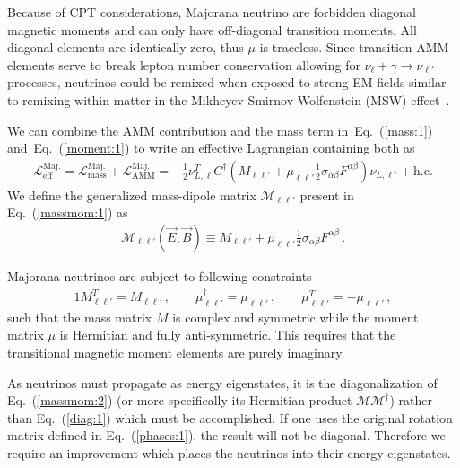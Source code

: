 \documentclass[addchapnum]{ws-rv961x669} %
\newcommand{\req}[1]{Eq.~(\ref{#1})}
\begin{document}
Because of CPT considerations, Majorana neutrino are forbidden diagonal magnetic moments and can only have off-diagonal transition moments. All diagonal elements are identically zero, thus $\mu$ is traceless. Since transition AMM elements serve to break lepton number conservation allowing for $\nu_{\ell}+\gamma\rightarrow\nu_{\ell'}$ processes,  neutrinos could be remixed when exposed to strong EM fields similar to remixing within matter in the Mikheyev-Smirnov-Wolfenstein (MSW) effect~\citep{Wolfenstein:1977ue,Mikheyev:1985zog}. %

We can combine the AMM contribution and the mass term in~\req{mass:1} and~\req{moment:1} to write an effective Lagrangian containing both as
\begin{align}
	\label{massmom:1}
    \mathcal{L}_\mathrm{eff}^\mathrm{Maj.} =
    \mathcal{L}_\mathrm{mass}^\mathrm{Maj.} + \mathcal{L}_\mathrm{AMM}^\mathrm{Maj.} = 
    -\frac{1}{2}\nu_{L,\ell}^{T}C^{\dag}\left(M_{\ell\ell'}+\mu_{\ell\ell'}\frac{1}{2}\sigma_{\alpha\beta}F^{\alpha\beta}\right)\nu_{L,\ell'}+\mathrm{h.c.}
\end{align}
We define the generalized mass-dipole matrix $\mathcal{M}_{\ell\ell'}$ present in \req{massmom:1} as
\begin{align}
	\label{massmom:2}
    \mathcal{M}_{\ell\ell'}(\vec{E},\vec{B})\equiv M_{\ell\ell'}+\mu_{\ell\ell'}\frac{1}{2}\sigma_{\alpha\beta}F^{\alpha\beta}\,.
\end{align}

Majorana neutrinos are subject to following constraints~\cite{Giunti:2014ixa}
\begin{alignat}{1}
	\label{props:1}	M_{\ell\ell'}^{T}=M_{\ell\ell'}\,,\qquad
    \mu_{\ell\ell'}^{\dag}=\mu_{\ell\ell'}\,,\qquad
    \mu_{\ell\ell'}^{T}=-\mu_{\ell\ell'}\,,
\end{alignat}
such that the mass matrix $M$ is complex and symmetric while the moment matrix $\mu$ is Hermitian and fully anti-symmetric. This requires that the transitional magnetic moment elements are purely imaginary. 

As neutrinos must propagate as energy eigenstates, it is the diagonalization of \req{massmom:2} (or more specifically its Hermitian product $\mathcal{M}\mathcal{M}^{\dag}$) rather than \req{diag:1} which must be accomplished. If one uses the original rotation matrix defined in \req{phases:1}, the result will not be diagonal. Therefore we require an improvement which places the neutrinos into their energy eigenstates.
\end{document}
